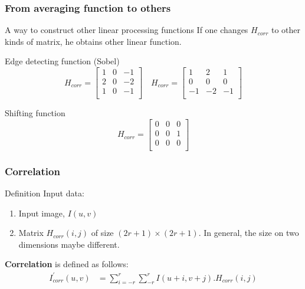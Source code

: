 \documentclass[english,11pt,table,handout]{beamer}
\begin{document}
\frame
{
	\frametitle{From averaging function to others}
	\begin{block}{A way to construct other linear processing functions}
		If one changes $H_{corr}$ to other kinds of matrix, he obtains other linear function.
	\end{block}
	
	\begin{example}
	Edge detecting function (Sobel)
	$$
		H_{corr} = 
		\begin{bmatrix}
			1 & 0 & -1 \\
			2 & 0 & -2 \\
			1 & 0 & -1 \\
		\end{bmatrix}
		\quad 
		H_{corr} = 
		\begin{bmatrix}
			1 & 2 & 1 \\
			0 & 0 & 0 \\
			-1 & -2 & -1 \\
		\end{bmatrix}
	$$
	
	Shifting function
	$$
	H_{corr} = 
	\begin{bmatrix}
		0 & 0 & 0 \\
		0 & 0 & 1 \\
		0 & 0 & 0 \\
	\end{bmatrix}
	$$
	\end{example}
}


\frame
{
	\frametitle{Correlation}
	
	\begin{block}{Definition}
		Input data:
		\begin{enumerate}
			\item Input image, $I(u,v)$
			\item Matrix $H_{corr}{(i,j)}$ of size $(2r+1) \times (2r+1)$. In general, the size on two dimensions maybe different.
		\end{enumerate}
		\textbf{Correlation} is defined as follows:
		\begin{equation*} 
		\begin{split}
		I_{corr}^{'}{(u,v)} &= \sum_{i=-r}^{r}{\sum_{-r}^{r}{I(u+i, v+j).H_{corr}{(i,j)}}}
		\end{split}
		\end{equation*}
	\end{block}
}
\end{document}
